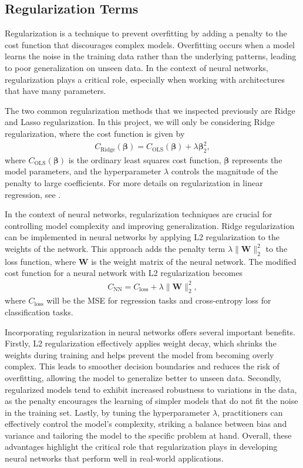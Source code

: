 \documentclass[%
reprint,
amsmath,amssymb,
aps,
]{revtex4-2}
\begin{document}
\subsection{Regularization Terms}
Regularization is a technique to prevent overfitting by adding a penalty to the cost function that discourages complex models. Overfitting occurs when a model learns the noise in the training data rather than the underlying patterns, leading to poor generalization on unseen data. In the context of neural networks, regularization plays a critical role, especially when working with architectures that have many parameters.

The two common regularization methods that we inspected previously are Ridge and Lasso regularization. In this project, we will only be considering Ridge regularization, where the cost function is given by
\begin{align}
	C_\text{Ridge}(\bm \beta)=C_\text{OLS}(\bm\beta)+\lambda\bm\beta_2^2,
\end{align}
where \(C_\text{OLS}(\bm\beta)\) is the ordinary least squares cost function, \(\bm\beta\) represents the model parameters, and the hyperparameter \(\lambda\) controls the magnitude of the penalty to large coefficients. For more details on regularization in linear regression, see \cite{project1}.

In the context of neural networks, regularization techniques are crucial for controlling model complexity and improving generalization. Ridge regularization can be implemented in neural networks by applying L2 regularization to the weights of the network. This approach adds the penalty term \( \lambda \|\mathbf{W}\|_2^2 \) to the loss function, where \( \mathbf{W} \) is the weight matrix of the neural network. The modified cost function for a neural network with L2 regularization becomes
\begin{align}
	C_{\text{NN}}=C_{\text{loss}}+\lambda \|\mathbf{W}\|_2^2,
\end{align}
where \( C_{\text{loss}} \) will be the MSE for regression tasks and cross-entropy loss for classification tasks.

Incorporating regularization in neural networks offers several important benefits. Firstly, L2 regularization effectively applies weight decay, which shrinks the weights during training and helps prevent the model from becoming overly complex. This leads to smoother decision boundaries and reduces the risk of overfitting, allowing the model to generalize better to unseen data. Secondly, regularized models tend to exhibit increased robustness to variations in the data, as the penalty encourages the learning of simpler models that do not fit the noise in the training set. Lastly, by tuning the hyperparameter \( \lambda \), practitioners can effectively control the model's complexity, striking a balance between bias and variance and tailoring the model to the specific problem at hand. Overall, these advantages highlight the critical role that regularization plays in developing neural networks that perform well in real-world applications.
\end{document}
